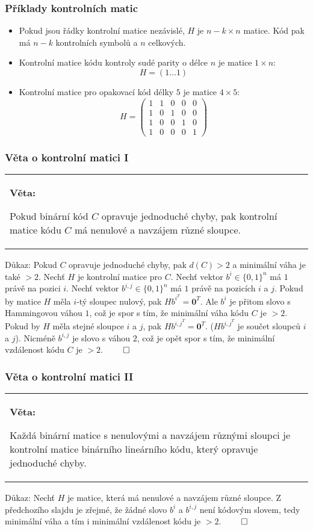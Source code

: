 \documentclass{beamer}
\newenvironment{veta}
{
    \begin{center}
    \begin{tabular}{p{9cm}}
    \textbf{Věta:}
}
{
    \end{tabular}
    \end{center}
}
\newcommand{\zero}{\textbf{0}}
\newcommand{\emptyline}{\\$\,$\\}
\newenvironment{itemizey}%
  {\large \begin{itemize}%
    \setlength{\itemsep}{6pt}%
    \setlength{\parskip}{6pt}}%
  {\end{itemize}}
\begin{document}
\begin{frame}[t,fragile]\frametitle{Příklady kontrolních matic} 
    \begin{itemizey}
        \item Pokud jsou řádky kontrolní matice nezávislé, $H$ je $n-k\times n$ matice. Kód pak má $n-k$ kontrolních symbolů a $n$ celkových.
        \item Kontrolní matice kódu kontroly sudé parity o délce $n$ je matice $1\times n$:
$$
H = (1\dots1)
$$
        \item Kontrolní matice pro opakovací kód délky $5$ je matice $4\times5$:
$$
H=
\begin{pmatrix}
1&1&0&0&0\\
1&0&1&0&0\\
1&0&0&1&0\\
1&0&0&0&1
\end{pmatrix}
$$
    \end{itemizey}
\end{frame}




\begin{frame}[t,fragile]\frametitle{Věta o kontrolní matici I} 
    \begin{veta}
Pokud binární kód $C$ opravuje jednoduché chyby, pak kontrolní matice kódu $C$ má nenulové a navzájem různé sloupce. 
    \end{veta}

    Důkaz: Pokud $C$ opravuje jednoduché chyby, pak $d(C)>2$ a minimální váha je také $>2$. Nechť $H$ je kontrolní matice pro $C$. Nechť vektor $b^i\in\{0,1\}^n$ má $1$ právě na pozici $i$. Nechť vektor $b^{i,j}\in\{0,1\}^n$ má $1$ právě na pozicích $i$ a $j$. Pokud by matice $H$ měla $i$-tý sloupec nulový, pak $Hb^{i^T}=\zero^T$. Ale $b^i$ je přitom slovo s Hammingovou váhou $1$, což je spor s tím, že minimální váha kódu $C$ je $>2$.
\emptyline
    Pokud by $H$ měla stejné sloupce $i$ a $j$, pak $Hb^{{i,j}^T}=\zero^T$. ($Hb^{{i,j}^T}$ je součet sloupců $i$ a $j$). Nicméně $b^{i,j}$ je slovo s váhou $2$, což je opět spor s tím, že minimální vzdálenost kódu $C$ je $>2$. $\qed$
\end{frame}


\begin{frame}[t,fragile]\frametitle{Věta o kontrolní matici II} 
    \begin{veta}
    Každá binární matice s nenulovými a navzájem různými sloupci je kontrolní matice binárního lineárního kódu, který opravuje jednoduché chyby.
    \end{veta}

    Důkaz: Nechť $H$ je matice, která má nenulové a navzájem různé sloupce. Z předchozího slajdu je zřejmé, že žádné slovo $b^i$ a $b^{i, j}$ není kódovým slovem, tedy minimální váha a tím i minimální vzdálenost kódu je $>2$. $\qed$
\end{frame}
\end{document}
